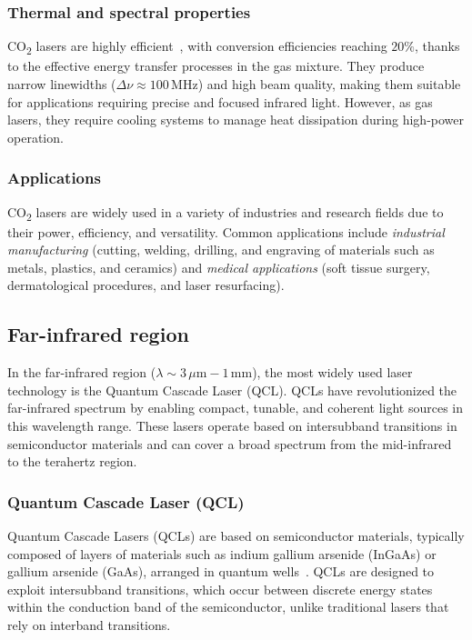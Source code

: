 \documentclass[prl,twocolumn]{revtex4-1}
\begin{document}
\subsubsection{\textbf{Thermal and spectral properties}}
CO\textsubscript{2} lasers are highly efficient~\cite{co2_lasers}, with conversion efficiencies reaching \( 20\% \), thanks to the effective energy transfer processes in the gas mixture. They produce narrow linewidths (\( \Delta\nu \approx 100 \, \text{MHz} \)) and high beam quality, making them suitable for applications requiring precise and focused infrared light. However, as gas lasers, they require cooling systems to manage heat dissipation during high-power operation.

\subsubsection{\textbf{Applications}}
CO\textsubscript{2} lasers are widely used in a variety of industries and research fields due to their power, efficiency, and versatility. Common applications include \textit{industrial manufacturing} (cutting, welding, drilling, and engraving of materials such as metals, plastics, and ceramics) and \textit{medical applications} (soft tissue surgery, dermatological procedures, and laser resurfacing).

\subsection{Far-infrared region}
In the far-infrared region (\( \lambda \sim 3 \, \mu\text{m} - 1 \, \text{mm} \)), the most widely used laser technology is the Quantum Cascade Laser (QCL). QCLs have revolutionized the far-infrared spectrum by enabling compact, tunable, and coherent light sources in this wavelength range. These lasers operate based on intersubband transitions in semiconductor materials and can cover a broad spectrum from the mid-infrared to the terahertz region.

\subsubsection{\textbf{Quantum Cascade Laser (QCL)}}
Quantum Cascade Lasers (QCLs) are based on semiconductor materials, typically composed of layers of materials such as indium gallium arsenide (InGaAs) or gallium arsenide (GaAs), arranged in quantum wells~\cite{qcl_lasers}. QCLs are designed to exploit intersubband transitions, which occur between discrete energy states within the conduction band of the semiconductor, unlike traditional lasers that rely on interband transitions.
\end{document}
